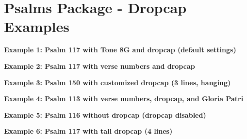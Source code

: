 \documentclass{article}
\begin{document}
\section*{Psalms Package - Dropcap Examples}

\textbf{Example 1: Psalm 117 with Tone 8G and dropcap (default settings)}


\bigskip

\textbf{Example 2: Psalm 117 with verse numbers and dropcap}


\bigskip

\textbf{Example 3: Psalm 150 with customized dropcap (3 lines, hanging)}

\renewcommand*\PsalmDropcapLines{3}
\renewcommand*\PsalmDropcapLhang{0.3}
\renewcommand*\PsalmDropcapLoversize{0.1}


\bigskip

\textbf{Example 4: Psalm 113 with verse numbers, dropcap, and Gloria Patri}

\renewcommand*\PsalmDropcapLines{2}
\renewcommand*\PsalmDropcapLhang{0}
\renewcommand*\PsalmDropcapLoversize{0}


\bigskip

\textbf{Example 5: Psalm 116 without dropcap (dropcap disabled)}


\bigskip

\textbf{Example 6: Psalm 117 with tall dropcap (4 lines)}

\renewcommand*\PsalmDropcapLines{4}
\renewcommand*\PsalmDropcapLhang{0.2}
\renewcommand*\PsalmDropcapLoversize{0.15}
\renewcommand*\PsalmDropcapLraise{0}

\end{document}

